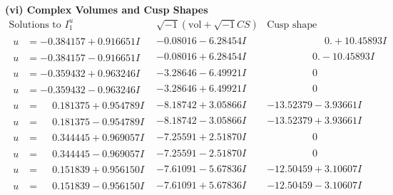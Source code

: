 \documentclass[1p]{elsarticle_modified}
\theoremstyle{definition}
\newcommand{\I}{\sqrt{-1}}
\begin{document}
\newpage\flushleft \textbf{(vi) Complex Volumes and Cusp Shapes}
$$\begin{array}{c|c|c}  
\text{Solutions to }I^u_{1}& \I (\text{vol} + \sqrt{-1}CS) & \text{Cusp shape}\\
 \hline 
\begin{aligned}
u &= -0.384157 + 0.916651 I\end{aligned}
 & -0.08016 - 6.28454 I & \phantom{-0.000000 -}0. + 10.45893 I \\ \hline\begin{aligned}
u &= -0.384157 - 0.916651 I\end{aligned}
 & -0.08016 + 6.28454 I & \phantom{-0.000000 } 0. - 10.45893 I \\ \hline\begin{aligned}
u &= -0.359432 + 0.963246 I\end{aligned}
 & -3.28646 - 6.49921 I & \phantom{-0.000000 } 0 \\ \hline\begin{aligned}
u &= -0.359432 - 0.963246 I\end{aligned}
 & -3.28646 + 6.49921 I & \phantom{-0.000000 } 0 \\ \hline\begin{aligned}
u &= \phantom{-}0.181375 + 0.954789 I\end{aligned}
 & -8.18742 + 3.05866 I & -13.52379 - 3.93661 I \\ \hline\begin{aligned}
u &= \phantom{-}0.181375 - 0.954789 I\end{aligned}
 & -8.18742 - 3.05866 I & -13.52379 + 3.93661 I \\ \hline\begin{aligned}
u &= \phantom{-}0.344445 + 0.969057 I\end{aligned}
 & -7.25591 + 2.51870 I & \phantom{-0.000000 } 0 \\ \hline\begin{aligned}
u &= \phantom{-}0.344445 - 0.969057 I\end{aligned}
 & -7.25591 - 2.51870 I & \phantom{-0.000000 } 0 \\ \hline\begin{aligned}
u &= \phantom{-}0.151839 + 0.956150 I\end{aligned}
 & -7.61091 - 5.67836 I & -12.50459 + 3.10607 I \\ \hline\begin{aligned}
u &= \phantom{-}0.151839 - 0.956150 I\end{aligned}
 & -7.61091 + 5.67836 I & -12.50459 - 3.10607 I \\ \hline\begin{aligned}

\end{aligned}
\end{array}$$
\end{document}
